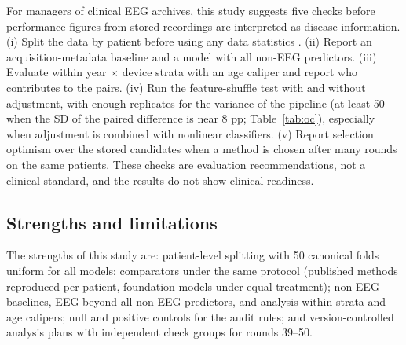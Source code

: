 For managers of clinical EEG archives, this study suggests five checks before performance figures from stored recordings are interpreted as disease information. (i) Split the data by patient before using any data statistics \cite{delpup2025,brookshire2024,rosenblatt2024}. (ii) Report an acquisition-metadata baseline and a model with all non-EEG predictors. (iii) Evaluate within year $\times$ device strata with an age caliper and report who contributes to the pairs. (iv) Run the feature-shuffle test with and without adjustment, with enough replicates for the variance of the pipeline (at least 50 when the SD of the paired difference is near 8 pp; Table~\ref{tab:oc}), especially when adjustment is combined with nonlinear classifiers. (v) Report selection optimism over the stored candidates when a method is chosen after many rounds on the same patients. These checks are evaluation recommendations, not a clinical standard, and the results do not show clinical readiness.

\subsection*{Strengths and limitations}

The strengths of this study are: patient-level splitting with 50 canonical folds uniform for all models; comparators under the same protocol (published methods reproduced per patient, foundation models under equal treatment); non-EEG baselines, EEG beyond all non-EEG predictors, and analysis within strata and age calipers; null and positive controls for the audit rules; and version-controlled analysis plans with independent check groups for rounds 39--50.

